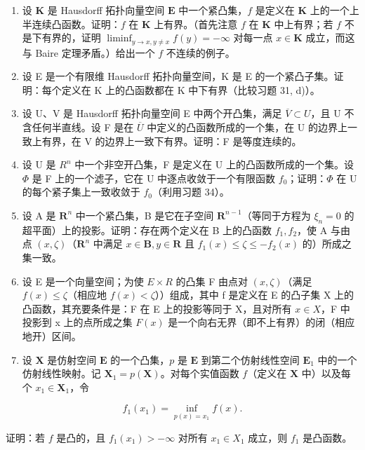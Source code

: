 \begin{enumerate}
\def\labelenumi{\arabic{enumi})}
\setcounter{enumi}{31}
\item
  设 \(\mathbf{K}\) 是 Hausdorff 拓扑向量空间 \(\mathbf{E}\) 中一个紧凸集，\(f\) 是定义在 \(\mathbf{K}\) 上的一个上半连续凸函数。证明：\(f\) 在 \(\mathbf{K}\) 上有界。（首先注意 \(f\) 在 \(\mathbf{K}\) 中上有界；若 \(f\) 不是下有界的，证明 \(\liminf_{y\to x,y\neq x}f(y) = -\infty\) 对每一点 \(x\in \mathbf{K}\) 成立，而这与 Baire 定理矛盾。）给出一个 \(f\) 不连续的例子。
\item
  设 E 是一个有限维 Hausdorff 拓扑向量空间，K 是 E 的一个紧凸子集。证明：每个定义在 K 上的凸函数都在 K 中下有界（比较习题 31, d)）。
\item
  设 U、V 是 Hausdorff 拓扑向量空间 E 中两个开凸集，满足 \(\overline{V} \subset U\)，且 U 不含任何半直线。设 F 是在 \(\overline{U}\) 中定义的凸函数所成的一个集，在 U 的边界上一致上有界，在 V 的边界上一致下有界。证明：F 是等度连续的。
\item
  设 U 是 \(R^{n}\) 中一个非空开凸集，F 是定义在 U 上的凸函数所成的一个集。设 \(\Phi\) 是 F 上的一个滤子，它在 U 中逐点收敛于一个有限函数 \(f_{0}\)；证明：\(\Phi\) 在 U 的每个紧子集上一致收敛于 \(f_{0}\)（利用习题 34）。
\item
  设 A 是 \(\mathbf{R}^n\) 中一个紧凸集，B 是它在子空间 \(\mathbf{R}^{n-1}\)（等同于方程为 \(\xi_n = 0\) 的超平面）上的投影。证明：存在两个定义在 B 上的凸函数 \(f_1, f_2\)，使 A 与由点 \((x, \zeta)\)（\(\mathbf{R}^n\) 中满足 \(x \in \mathbf{B}, y \in \mathbf{R}\) 且 \(f_1(x) \leqslant \zeta \leqslant -f_2(x)\) 的）所成之集一致。
\item
  设 E 是一个向量空间；为使 \(E \times R\) 的凸集 F 由点对 \((x, \zeta)\)（满足 \(f(x) \leqslant \zeta\)（相应地 \(f(x) < \zeta\)））组成，其中 f 是定义在 E 的凸子集 X 上的凸函数，其充要条件是：F 在 E 上的投影等同于 X，且对所有 \(x \in X\)，F 中投影到 x 上的点所成之集 \(F(x)\) 是一个向右无界（即不上有界）的闭（相应地开）区间。
\item
  设 \(\mathbf{X}\) 是仿射空间 \(\mathbf{E}\) 的一个凸集，\(p\) 是 \(\mathbf{E}\) 到第二个仿射线性空间 \(\mathbf{E}_1\) 中的一个仿射线性映射。记 \(\mathbf{X}_1 = p(\mathbf{X})\)。对每个实值函数 \(f\)（定义在 \(\mathbf{X}\) 中）以及每个 \(x_1 \in \mathbf{X}_1\)，令
\end{enumerate}

\[
f _ {1} (x _ {1}) = \inf _ {p (x) = x _ {1}} f (x).
\]

证明：若 \(f\) 是凸的，且 \(f_{1}(x_{1}) > -\infty\) 对所有 \(x_{1} \in X_{1}\) 成立，则 \(f_{1}\) 是凸函数。

